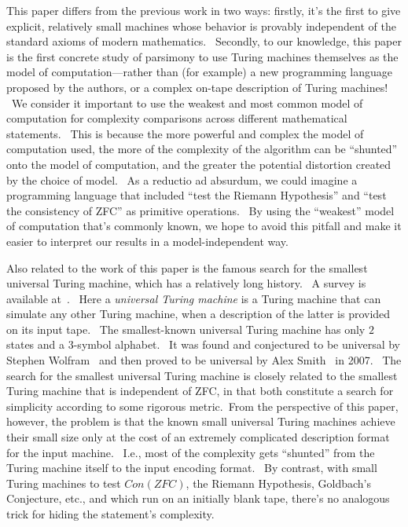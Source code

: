 \documentclass[11pt]{article}
\begin{document}
This paper differs from the previous work in two ways: firstly, it's the first to give explicit, relatively small machines whose behavior is provably independent of the standard axioms of modern mathematics. \ Secondly, to our knowledge, this paper is the first concrete study of parsimony to use Turing machines themselves as the model of computation---rather than (for example) a new programming language proposed by the authors, or a complex on-tape description of Turing machines! \ We consider it important to use the weakest and most common model of computation for complexity comparisons across different mathematical statements. \ This is because the more powerful and complex the model of computation used, the more of the complexity of the algorithm can be ``shunted'' onto the model of computation, and the greater the potential distortion created by the choice of model. \ As a reductio ad absurdum, we could imagine a programming language that included ``test the Riemann Hypothesis'' and ``test the consistency of ZFC'' as primitive operations. \ By using the ``weakest'' model of computation that's commonly known, we hope to avoid this pitfall and make it easier to interpret our results in a model-independent way.

Also related to the work of this paper is the famous search for the smallest universal Turing machine, which has a relatively long history. \ A survey is available at~\cite{universalsurvey}. \ Here a \emph{universal Turing machine} is a Turing machine that can simulate any other Turing machine, when a description of the latter is provided on its input tape. \ The smallest-known universal Turing machine has only $2$ states and a $3$-symbol alphabet. \ It was found and conjectured to be universal by Stephen Wolfram~\cite{newscience} and then proved to be universal by Alex Smith~\cite{universal} in 2007. \ The search for the smallest universal Turing machine is closely related to the smallest Turing machine that is independent of ZFC, in that both constitute a search for simplicity according to some rigorous metric.\footnotemark \ From the perspective of this paper, however, the problem is that the known small universal Turing machines achieve their small size only at the cost of an extremely complicated description format for the input machine. \ I.e., most of the complexity gets ``shunted'' from the Turing machine itself to the input encoding format. \ By contrast, with small Turing machines to test $Con(ZFC)$, the Riemann Hypothesis, Goldbach's Conjecture, etc., and which run on an initially blank tape, there's no analogous trick for hiding the statement's complexity.
\end{document}
